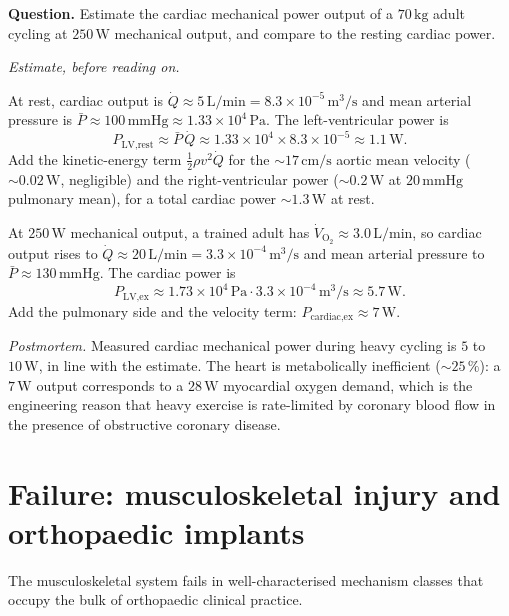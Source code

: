\begin{estimation}
\textbf{Question.} Estimate the cardiac mechanical power output of a
$70\,\text{kg}$ adult cycling at $250\,\text{W}$ mechanical output,
and compare to the resting cardiac power.

\smallskip
\textit{Estimate, before reading on.}

\smallskip
At rest, cardiac output is $\dot Q \approx 5\,\text{L/min} =
8.3 \times 10^{-5}\,\text{m}^3/\text{s}$ and mean arterial pressure
is $\bar P \approx 100\,\text{mmHg} \approx 1.33\times 10^{4}\,\text{Pa}$.
The left-ventricular power is
\[
P_{\text{LV,rest}} \approx \bar P\, \dot Q \approx 1.33\times 10^{4}
\times 8.3\times 10^{-5} \approx 1.1\,\text{W}.
\]
Add the kinetic-energy term $\tfrac{1}{2}\rho v^2 \dot Q$ for the
$\sim 17\,\text{cm/s}$ aortic mean velocity ($\sim 0.02\,\text{W}$,
negligible) and the right-ventricular power
($\sim 0.2\,\text{W}$ at $20\,\text{mmHg}$ pulmonary mean), for a
total cardiac power $\sim 1.3\,\text{W}$ at rest.

At $250\,\text{W}$ mechanical output, a trained adult has
$\dot V_{\text{O}_2} \approx 3.0\,\text{L/min}$, so cardiac output
rises to $\dot Q \approx 20\,\text{L/min} = 3.3\times 10^{-4}\,\text{m}^3/\text{s}$
and mean arterial pressure to $\bar P \approx 130\,\text{mmHg}$. The
cardiac power is
\[
P_{\text{LV,ex}} \approx 1.73\times 10^{4}\,\text{Pa} \cdot
3.3\times 10^{-4}\,\text{m}^3/\text{s} \approx 5.7\,\text{W}.
\]
Add the pulmonary side and the velocity term:
$P_{\text{cardiac,ex}} \approx 7\,\text{W}$.

\smallskip
\textit{Postmortem.} Measured cardiac mechanical power during heavy
cycling is $5$ to $10\,\text{W}$, in line with the estimate. The
heart is metabolically inefficient ($\sim 25\,\%$): a $7\,\text{W}$
output corresponds to a $28\,\text{W}$ myocardial oxygen demand,
which is the engineering reason that heavy exercise is rate-limited
by coronary blood flow in the presence of obstructive coronary
disease.
\end{estimation}

\section{Failure: musculoskeletal injury and orthopaedic implants}

The musculoskeletal system fails in well-characterised mechanism
classes that occupy the bulk of orthopaedic clinical practice.

